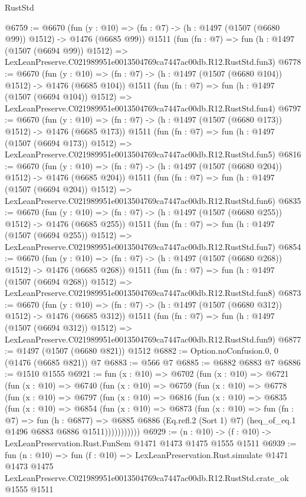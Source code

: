 \begin{lexlean}{RustStd}
\begin{coremodule}
@6759 := @6670
    (fun (y : @10) => (fn : @7) -> (h : @1497 (@1507 (@6680 @99)) @1512) -> @1476 (@6685 @99))
    @1511
    (fun (fn : @7) =>
    fun (h : @1497 (@1507 (@6694 @99)) @1512) =>
    LexLeanPreserve.C021989951e0013504769ca7447ac00db.R12.RustStd.fun3)
@6778 := @6670
    (fun (y : @10) => (fn : @7) -> (h : @1497 (@1507 (@6680 @104)) @1512) -> @1476 (@6685 @104))
    @1511
    (fun (fn : @7) =>
    fun (h : @1497 (@1507 (@6694 @104)) @1512) =>
    LexLeanPreserve.C021989951e0013504769ca7447ac00db.R12.RustStd.fun4)
@6797 := @6670
    (fun (y : @10) => (fn : @7) -> (h : @1497 (@1507 (@6680 @173)) @1512) -> @1476 (@6685 @173))
    @1511
    (fun (fn : @7) =>
    fun (h : @1497 (@1507 (@6694 @173)) @1512) =>
    LexLeanPreserve.C021989951e0013504769ca7447ac00db.R12.RustStd.fun5)
@6816 := @6670
    (fun (y : @10) => (fn : @7) -> (h : @1497 (@1507 (@6680 @204)) @1512) -> @1476 (@6685 @204))
    @1511
    (fun (fn : @7) =>
    fun (h : @1497 (@1507 (@6694 @204)) @1512) =>
    LexLeanPreserve.C021989951e0013504769ca7447ac00db.R12.RustStd.fun6)
@6835 := @6670
    (fun (y : @10) => (fn : @7) -> (h : @1497 (@1507 (@6680 @255)) @1512) -> @1476 (@6685 @255))
    @1511
    (fun (fn : @7) =>
    fun (h : @1497 (@1507 (@6694 @255)) @1512) =>
    LexLeanPreserve.C021989951e0013504769ca7447ac00db.R12.RustStd.fun7)
@6854 := @6670
    (fun (y : @10) => (fn : @7) -> (h : @1497 (@1507 (@6680 @268)) @1512) -> @1476 (@6685 @268))
    @1511
    (fun (fn : @7) =>
    fun (h : @1497 (@1507 (@6694 @268)) @1512) =>
    LexLeanPreserve.C021989951e0013504769ca7447ac00db.R12.RustStd.fun8)
@6873 := @6670
    (fun (y : @10) => (fn : @7) -> (h : @1497 (@1507 (@6680 @312)) @1512) -> @1476 (@6685 @312))
    @1511
    (fun (fn : @7) =>
    fun (h : @1497 (@1507 (@6694 @312)) @1512) =>
    LexLeanPreserve.C021989951e0013504769ca7447ac00db.R12.RustStd.fun9)
@6877 := @1497 (@1507 (@6680 @821)) @1512
@6882 := Option.noConfusion.{0, 0} (@1476 (@6685 @821)) @7
@6883 := @566 @7
@6885 := @6882 @6883 @7
@6886 := @1510 @1555
@6921 := fun (x : @10) =>
  @6702
    (fun (x : @10) =>
    @6721
      (fun (x : @10) =>
      @6740
        (fun (x : @10) =>
        @6759
          (fun (x : @10) =>
          @6778
            (fun (x : @10) =>
            @6797
              (fun (x : @10) =>
              @6816
                (fun (x : @10) =>
                @6835
                  (fun (x : @10) =>
                  @6854
                    (fun (x : @10) =>
                    @6873
                      (fun (x : @10) =>
                      fun (fn : @7) =>
                      fun (h : @6877) =>
                      @6885
                        @6886
                        (Eq.refl.{2} (Sort 1) @7)
                        (heq_of_eq.{1} @1496 @6883 @6886 @1511)))))))))))
@6929 := (n : @10) -> (f : @10) -> LexLeanPreservation.Rust.FunSem @1471 @1473 @1475 @1555 @1511
@6939 := fun (n : @10) =>
  fun (f : @10) =>
  LexLeanPreservation.Rust.simulate
    @1471
    @1473
    @1475
    LexLeanPreserve.C021989951e0013504769ca7447ac00db.R12.RustStd.crate_ok
    @1555
    @1511
\end{coremodule}
\end{lexlean}
